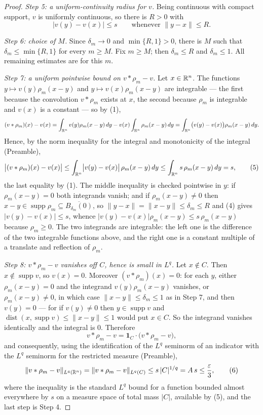 \begin{proof}
\emph{Step 5: a uniform-continuity radius for $v$.}  Being continuous with
compact support, $v$ is uniformly continuous, so there is $R>0$ with
\[
|v(y)-v(x)|\le s\qquad\text{whenever }\|y-x\|\le R .
\tag{4}
\]

\emph{Step 6: choice of $M$.}  Since $\delta_m\to0$ and $\min\{R,1\}>0$, there is
$M$ such that $\delta_m\le\min\{R,1\}$ for every $m\ge M$.  Fix $m\ge M$; then
$\delta_m\le R$ and $\delta_m\le1$.  All remaining estimates are for this $m$.

\emph{Step 7: a uniform pointwise bound on $v*\rho_m-v$.}  Let $x\in\mathbb{R}^n$.  The
functions $y\mapsto v(y)\rho_m(x-y)$ and $y\mapsto v(x)\rho_m(x-y)$ are
integrable --- the first because the convolution $v*\rho_m$ exists at $x$, the
second because $\rho_m$ is integrable and $v(x)$ is a constant --- so by (1),
\[
(v*\rho_m)(x)-v(x)
=\int_{\mathbb{R}^n}v(y)\rho_m(x-y)\,dy-v(x)\int_{\mathbb{R}^n}\rho_m(x-y)\,dy
=\int_{\mathbb{R}^n}\bigl(v(y)-v(x)\bigr)\rho_m(x-y)\,dy .
\]
Hence, by the norm inequality for the integral and monotonicity of the integral
(Preamble),
\[
\bigl|(v*\rho_m)(x)-v(x)\bigr|
\le\int_{\mathbb{R}^n}\bigl|v(y)-v(x)\bigr|\,\rho_m(x-y)\,dy
\le\int_{\mathbb{R}^n}s\,\rho_m(x-y)\,dy=s ,
\tag{5}
\]
the last equality by (1).  The middle inequality is checked pointwise in $y$:
if $\rho_m(x-y)=0$ both integrands vanish; and if $\rho_m(x-y)\ne0$ then
$x-y\in\operatorname{supp}\rho_m\subseteq\overline{B_{\delta_m}(0)}$, so
$\|y-x\|=\|x-y\|\le\delta_m\le R$ and (4) gives
$|v(y)-v(x)|\le s$, whence
$|v(y)-v(x)|\rho_m(x-y)\le s\,\rho_m(x-y)$ because $\rho_m\ge0$.  The two
integrands are integrable: the left one is the difference of the two integrable
functions above, and the right one is a constant multiple of a translate and
reflection of $\rho_m$.

\emph{Step 8: $v*\rho_m-v$ vanishes off $C$, hence is small in $L^q$.}  Let
$x\notin C$.  Then $x\notin\operatorname{supp}v$, so $v(x)=0$.  Moreover
$(v*\rho_m)(x)=0$: for each $y$, either $\rho_m(x-y)=0$ and the integrand
$v(y)\rho_m(x-y)$ vanishes, or $\rho_m(x-y)\ne0$, in which case
$\|x-y\|\le\delta_m\le1$ as in Step 7, and then $v(y)=0$ --- for if
$v(y)\ne0$ then $y\in\operatorname{supp}v$ and
$\operatorname{dist}(x,\operatorname{supp}v)\le\|x-y\|\le1$ would put $x\in C$.
So the integrand vanishes identically and the integral is $0$.  Therefore
\[
v*\rho_m-v=\mathbf 1_C\cdot\bigl(v*\rho_m-v\bigr),
\]
and consequently, using the identification of the $L^q$ seminorm of an
indicator with the $L^q$ seminorm for the restricted measure (Preamble),
\[
\|v*\rho_m-v\|_{L^q(\mathbb{R}^n)}=\|v*\rho_m-v\|_{L^q(C)}\le s\,|C|^{1/q}=A\,s
\le\frac\varepsilon3 ,
\tag{6}
\]
where the inequality is the standard $L^q$ bound for a function bounded almost
everywhere by $s$ on a measure space of total mass $|C|$, available by (5), and
the last step is Step 4.


\end{proof}

